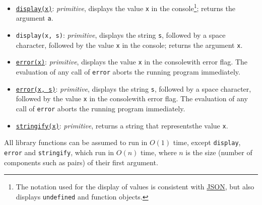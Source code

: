 \begin{itemize}
\item \href{https://sourceacademy.org/sicpjs/1.2.6\#footnote-7}{\texttt{display(x)}}: \textit{primitive}, displays the value \texttt{x} in the console\footnote{The notation used for the display of values is consistent with \href{http://www.ecma-international.org/publications/files/ECMA-ST/ECMA-404.pdf}{\color{DarkBlue}JSON}, but also displays \texttt{undefined} and function objects.}; returns the argument \texttt{a}.
\item \texttt{display(x, s)}: \textit{primitive}, displays the string \texttt{s}, followed by a space character, followed by the value \texttt{x} in the console\footnotemark[\value{footnote}]; returns the argument \texttt{x}.
\item \href{https://sourceacademy.org/sicpjs/1.2.6\#footnote-7}{\texttt{error(x)}}: \textit{primitive}, displays the value \texttt{x} in the console\footnotemark[\value{footnote}] with error flag. The evaluation
  of any call of \texttt{error} aborts the running program immediately.
\item \href{https://sourceacademy.org/sicpjs/2.1.3\#footnote-2}{\texttt{error(x, s)}}: \textit{primitive}, displays the string \texttt{s}, followed by a space character, followed by the value \texttt{x} in the console\footnotemark[\value{footnote}] with error flag. The evaluation
  of any call of \texttt{error} aborts the running program immediately.
\item \href{https://sourceacademy.org/sicpjs/3.3.4\#p24}{\lstinline{stringify(x)}}: \textit{primitive}, returns a string that represents\footnotemark[\value{footnote}] the value \texttt{x}. 
\end{itemize}
All library functions can be assumed to run
in $O(1)$ time, except \texttt{display}, \texttt{error} and \texttt{stringify}, 
which run in $O(n)$ time, where $n$ is
the size (number of components such as pairs) of their first argument.
